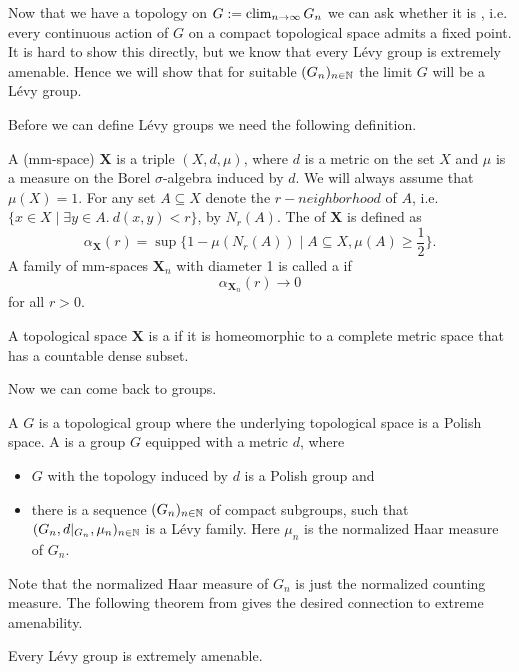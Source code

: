 Now that we have a topology on $G:=\operatorname{clim}\limits_{n\to\infty} G_n$ we can ask whether it is , i.e. every continuous action of $G$ on a compact topological space admits a fixed point. It is hard to show this directly, but we know that every L\'evy group is extremely amenable. Hence we will show that for suitable $(G_n)_{n\in\mathbb{N}}$ the limit $G$ will be a L\'evy group.

Before we can define L\'evy groups we need the following definition.
\begin{definition}
A  (mm-space) $\boldsymbol{X}$ is a triple $(X,d,\mu)$, where $d$ is a metric on the set $X$ and $\mu$ is a measure on the Borel $\sigma$-algebra induced by $d$. We will always assume that $\mu(X)=1$. 
For any set $A\subseteq X$ denote the $r-neighborhood$ of $A$, i.e. $\{x\in X\mid\exists y\in A.\  d(x,y)<r\}$, by $N_r(A)$.
The  of $\boldsymbol{X}$ is defined as 
\[\alpha_{\boldsymbol{X}}(r)=\sup\{1-\mu(N_r(A))\mid A\subseteq X, \mu(A)\geq\frac{1}{2}\}.\]
A family of mm-spaces $\boldsymbol{X}_n$ with diameter 1 is called a  if 
\[\alpha_{\boldsymbol{X}_n}(r)\to 0\]
for all $r>0$.

A topological space $\boldsymbol{X}$ is a  if it is homeomorphic to a complete metric space that has a countable dense subset.
\end{definition}

Now we can come back to groups.
\begin{definition}
A  $G$ is a topological group where the underlying topological space is a Polish space. A  is a group $G$ equipped with a metric $d$, where
\begin{itemize}
\item $G$ with the topology induced by $d$ is a Polish group and
\item there is a sequence $(G_n)_{n\in\mathbb{N}}$ of compact subgroups, such that $(G_n,d|_{G_n},\mu_n)_{n\in\mathbb{N}}$ is a L\'evy family. Here $\mu_n$ is the normalized Haar measure of $G_n$.
\end{itemize}  
\end{definition}
Note that the normalized Haar measure of $G_n$ is just the normalized counting measure.
The following theorem from \cite[Theorem \textbf{4.1.3}]{Levy} %
gives the desired connection to extreme amenability.
\begin{theorem}\label{thm:LevyImpliesExAm}
Every L\'evy group is extremely amenable.
\end{theorem}

